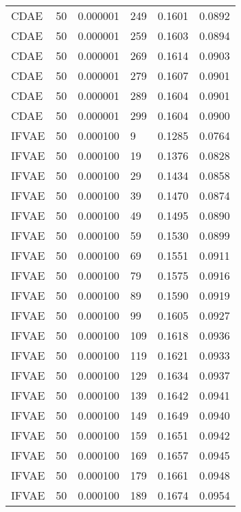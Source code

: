 \begin{tabular}{llrlrr}
    CDAE &   50 &  0.000001 &   249 &  0.1601 &       0.0892 \\
    CDAE &   50 &  0.000001 &   259 &  0.1603 &       0.0894 \\
    CDAE &   50 &  0.000001 &   269 &  0.1614 &       0.0903 \\
    CDAE &   50 &  0.000001 &   279 &  0.1607 &       0.0901 \\
    CDAE &   50 &  0.000001 &   289 &  0.1604 &       0.0901 \\
    CDAE &   50 &  0.000001 &   299 &  0.1604 &       0.0900 \\
   IFVAE &   50 &  0.000100 &     9 &  0.1285 &       0.0764 \\
   IFVAE &   50 &  0.000100 &    19 &  0.1376 &       0.0828 \\
   IFVAE &   50 &  0.000100 &    29 &  0.1434 &       0.0858 \\
   IFVAE &   50 &  0.000100 &    39 &  0.1470 &       0.0874 \\
   IFVAE &   50 &  0.000100 &    49 &  0.1495 &       0.0890 \\
   IFVAE &   50 &  0.000100 &    59 &  0.1530 &       0.0899 \\
   IFVAE &   50 &  0.000100 &    69 &  0.1551 &       0.0911 \\
   IFVAE &   50 &  0.000100 &    79 &  0.1575 &       0.0916 \\
   IFVAE &   50 &  0.000100 &    89 &  0.1590 &       0.0919 \\
   IFVAE &   50 &  0.000100 &    99 &  0.1605 &       0.0927 \\
   IFVAE &   50 &  0.000100 &   109 &  0.1618 &       0.0936 \\
   IFVAE &   50 &  0.000100 &   119 &  0.1621 &       0.0933 \\
   IFVAE &   50 &  0.000100 &   129 &  0.1634 &       0.0937 \\
   IFVAE &   50 &  0.000100 &   139 &  0.1642 &       0.0941 \\
   IFVAE &   50 &  0.000100 &   149 &  0.1649 &       0.0940 \\
   IFVAE &   50 &  0.000100 &   159 &  0.1651 &       0.0942 \\
   IFVAE &   50 &  0.000100 &   169 &  0.1657 &       0.0945 \\
   IFVAE &   50 &  0.000100 &   179 &  0.1661 &       0.0948 \\
   IFVAE &   50 &  0.000100 &   189 &  0.1674 &       0.0954 \\

\end{tabular}
